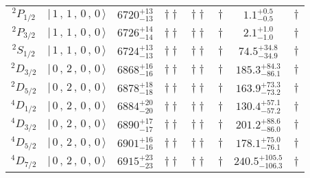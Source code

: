 \begin{tabular}{c| c c c c c c c}
$^{2}P_{1/2}$ & $\vert \,1\,,\,1\,,\,0\,,\,0 \,\rangle $ & $6720^{+13}_{-13}$ & $\dagger\dagger$ & $\dagger\dagger$ & $\dagger$ & $1.1^{+0.5}_{-0.5}$ & $\dagger$ \\ 
$^{2}P_{3/2}$ & $\vert \,1\,,\,1\,,\,0\,,\,0 \,\rangle $ & $6726^{+14}_{-14}$ & $\dagger\dagger$ & $\dagger\dagger$ & $\dagger$ & $2.1^{+1.0}_{-1.0}$ & $\dagger$ \\ 
$^{2}S_{1/2}$ & $\vert \,1\,,\,1\,,\,0\,,\,0 \,\rangle $ & $6724^{+13}_{-13}$ & $\dagger\dagger$ & $\dagger\dagger$ & $\dagger$ & $74.5^{+34.8}_{-34.9}$ & $\dagger$ \\ 
$^{2}D_{3/2}$ & $\vert \,0\,,\,2\,,\,0\,,\,0 \,\rangle $ & $6868^{+16}_{-16}$ & $\dagger\dagger$ & $\dagger\dagger$ & $\dagger$ & $185.3^{+84.3}_{-86.1}$ & $\dagger$ \\ 
$^{2}D_{5/2}$ & $\vert \,0\,,\,2\,,\,0\,,\,0 \,\rangle $ & $6878^{+18}_{-18}$ & $\dagger\dagger$ & $\dagger\dagger$ & $\dagger$ & $163.9^{+73.3}_{-73.2}$ & $\dagger$ \\ 
$^{4}D_{1/2}$ & $\vert \,0\,,\,2\,,\,0\,,\,0 \,\rangle $ & $6884^{+20}_{-20}$ & $\dagger\dagger$ & $\dagger\dagger$ & $\dagger$ & $130.4^{+57.1}_{-57.2}$ & $\dagger$ \\ 
$^{4}D_{3/2}$ & $\vert \,0\,,\,2\,,\,0\,,\,0 \,\rangle $ & $6890^{+17}_{-17}$ & $\dagger\dagger$ & $\dagger\dagger$ & $\dagger$ & $201.2^{+88.6}_{-86.0}$ & $\dagger$ \\ 
$^{4}D_{5/2}$ & $\vert \,0\,,\,2\,,\,0\,,\,0 \,\rangle $ & $6901^{+16}_{-16}$ & $\dagger\dagger$ & $\dagger\dagger$ & $\dagger$ & $178.1^{+75.0}_{-76.1}$ & $\dagger$ \\ 
$^{4}D_{7/2}$ & $\vert \,0\,,\,2\,,\,0\,,\,0 \,\rangle $ & $6915^{+23}_{-23}$ & $\dagger\dagger$ & $\dagger\dagger$ & $\dagger$ & $240.5^{+105.5}_{-106.3}$ & $\dagger$ \\ 
\hline \hline
\end{tabular}
